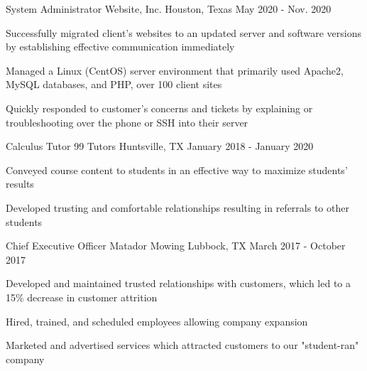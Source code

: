     \begin{cventries}

      \cventry
        {System Administrator} %
        {Website, Inc.} %
        {Houston, Texas} %
        {May 2020 - Nov. 2020} %
        {
          \begin{cvitems}
            \item {Successfully migrated client's websites to an updated server and software versions by establishing effective communication immediately}
            \item {Managed a Linux (CentOS) server environment that primarily used Apache2, MySQL databases, and PHP, over 100 client sites}
            \item {Quickly responded to customer's concerns and tickets by explaining or troubleshooting over the phone or SSH into their server}
          \end{cvitems}
        }

          \cventry
            {Calculus Tutor} 		%
            {99 Tutors} 			%
            {Huntsville, TX} %
            {January 2018 - January 2020} %
            {
              \begin{cvitems} %
                \item {Conveyed course content to students in an effective way to maximize students' results}
                \item {Developed trusting and comfortable relationships resulting in referrals to other students}
              \end{cvitems}
            }

          \cventry
            {Chief Executive Officer} %
            {Matador Mowing} %
            {Lubbock, TX} %
            {March 2017 - October 2017} %
            {
              \begin{cvitems} %
                \item {Developed and maintained trusted relationships with customers, which led to a 15\% decrease in customer attrition}
                \item {Hired, trained, and scheduled employees allowing company expansion}
               \item {Marketed and advertised services which attracted customers to our "student-ran" company}
              \end{cvitems}
            }


\end{cventries}
